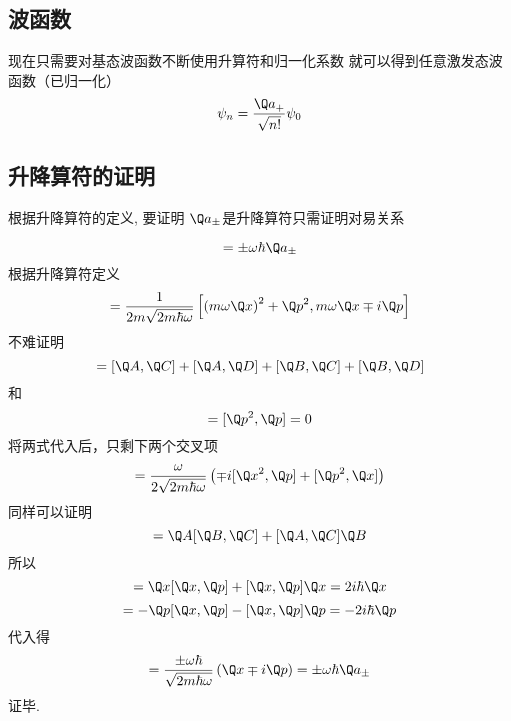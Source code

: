 \subsection{波函数}
现在只需要对基态波函数不断使用升算符和归一化系数%
就可以得到任意激发态波函数（已归一化）
\begin{equation}
{\psi_n} = \frac{{\Q a}_ + }{\sqrt {n!} }{\psi_0}
\end{equation}


\subsection{升降算符的证明}

根据升降算符的定义, 要证明 $\Q a_\pm$是升降算符只需证明对易关系

\begin{equation}
  [\Q H,{\Q a_ \pm }] =  \pm \omega\hbar  {\Q a_ \pm }
\end{equation}
根据升降算符定义
\begin{equation}
  [\Q H,{\Q a_ \pm }] = \frac{1}{2m\sqrt {2m\hbar \omega } }\left[ {{{\left( {m\omega \Q x} \right)}^2} + {{\Q p}^2},m\omega \Q x \mp i\Q p} \right]
\end{equation}
不难证明
\begin{equation}
  [\Q A + \Q B,\Q C + \Q D] = [\Q A,\Q C] + [\Q A,\Q D] + [\Q B,\Q C] + [\Q B,\Q D]
\end{equation}
和
\begin{equation}
  [{\Q x^2},\Q x] = [{\Q p^2},\Q p] = 0
\end{equation}
将两式代入后，只剩下两个交叉项
\begin{equation}
  [\Q H,{\Q a_ \pm }] = \frac{\omega }{2\sqrt {2m\hbar \omega } }\left( { \mp i[{{\Q x}^2},\Q p] + [{{\Q p}^2},\Q x]} \right)
\end{equation}
同样可以证明
\begin{equation}
  [\Q A\Q B,\Q C] = \Q A[\Q B,\Q C] + [\Q A,\Q C]\Q B
\end{equation}
所以
\begin{equation}
[{{\Q x}^2},\Q p] = \Q x[\Q x,\Q p] + [\Q x,\Q p]\Q x = 2i\hbar \Q x
\end{equation}
\begin{equation}
[{{\Q p}^2},\Q x] =  - \Q p[\Q x,\Q p] - [\Q x,\Q p]\Q p =  - 2i\hbar \Q p
\end{equation}
代入得
\begin{equation}
  [\Q H,{\Q a_ \pm }] = \frac{ \pm \omega \hbar }{\sqrt {2m\hbar \omega } }\left( {\Q x \mp i\Q p} \right) =  \pm \omega\hbar {\Q a_ \pm }
\end{equation}
证毕.
